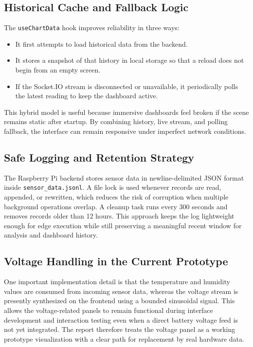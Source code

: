 \documentclass[conference]{IEEEtran}
\begin{document}
\subsection{Historical Cache and Fallback Logic}
The \texttt{useChartData} hook improves reliability in three ways:
\begin{itemize}
\item It first attempts to load historical data from the backend.
\item It stores a snapshot of that history in local storage so that a reload does not begin from an empty screen.
\item If the Socket.IO stream is disconnected or unavailable, it periodically polls the latest reading to keep the dashboard active.
\end{itemize}

This hybrid model is useful because immersive dashboards feel broken if the scene remains static after startup. By combining history, live stream, and polling fallback, the interface can remain responsive under imperfect network conditions.

\subsection{Safe Logging and Retention Strategy}
The Raspberry Pi backend stores sensor data in newline-delimited JSON format inside \texttt{sensor\_data.jsonl}. A file lock is used whenever records are read, appended, or rewritten, which reduces the risk of corruption when multiple background operations overlap. A cleanup task runs every 300 seconds and removes records older than 12 hours. This approach keeps the log lightweight enough for edge execution while still preserving a meaningful recent window for analysis and dashboard history.

\subsection{Voltage Handling in the Current Prototype}
One important implementation detail is that the temperature and humidity values are consumed from incoming sensor data, whereas the voltage stream is presently synthesized on the frontend using a bounded sinusoidal signal. This allows the voltage-related panels to remain functional during interface development and interaction testing even when a direct battery voltage feed is not yet integrated. The report therefore treats the voltage panel as a working prototype visualization with a clear path for replacement by real hardware data.
\end{document}
